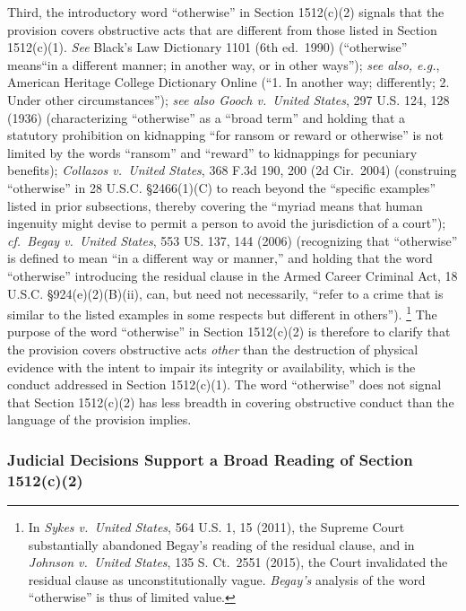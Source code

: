 Third, the introductory word “otherwise” in Section 1512(c)(2) signals that the provision covers obstructive acts that are different from those listed in Section 1512(c)(1).
\textit{See} Black’s Law Dictionary 1101 (6th ed.~1990) (“otherwise” means“in a different manner; in another way, or in other ways”);
\textit{see also, e.g.}, American Heritage College Dictionary Online (“1. In another way; differently; 2. Under other circumstances”);
\textit{see also Gooch v.\ United States}, 297 U.S. 124, 128 (1936) (characterizing “otherwise” as a “broad term” and holding that a statutory prohibition on kidnapping “for ransom or reward or otherwise” is not limited by the words “ransom” and “reward” to kidnappings for pecuniary benefits);
\textit{Collazos v.\ United States}, 368 F.3d 190, 200 (2d Cir.~2004) (construing “otherwise” in 28 U.S.C. \S 2466(1)(C) to reach beyond the “specific examples” listed in prior subsections, thereby covering the “myriad means that human ingenuity might devise to permit a person to avoid the jurisdiction of a court”);
\textit{cf.~Begay v.\ United States}, 553 US. 137, 144 (2006) (recognizing that “otherwise” is defined to mean “in a different way or manner,” and holding that the word “otherwise” introducing the residual clause in the Armed Career Criminal Act, 18 U.S.C. \S 924(e)(2)(B)(ii), can, but need not necessarily, “refer to a crime that is similar to the listed examples in some respects but different in others”).%
\footnote{In \textit{Sykes v.\ United States}, 564 U.S. 1, 15 (2011), the Supreme Court substantially abandoned Begay’s reading of the residual clause, and in \textit{Johnson v.\ United States}, 135 S. Ct.~2551 (2015), the Court invalidated the residual clause as unconstitutionally vague.
\textit{Begay’s} analysis of the word “otherwise” is thus of limited value.}
The purpose of the word “otherwise” in Section 1512(c)(2) is therefore to clarify that the provision covers obstructive acts \textit{other} than the destruction of physical evidence with the intent to impair its integrity or availability, which is the conduct addressed in Section 1512(c)(1).
The word “otherwise” does not signal that Section 1512(c)(2) has less breadth in covering obstructive conduct than the language of the provision implies.

\subsubsection{Judicial Decisions Support a Broad Reading of Section 1512(c)(2)}


